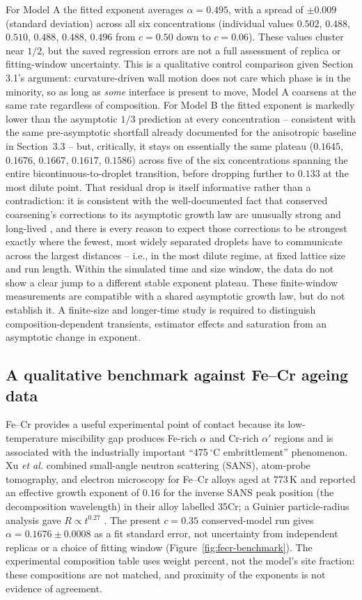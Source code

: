 \documentclass[11pt]{article}
\begin{document}
For Model A the fitted exponent averages $\alpha = 0.495$, with a
spread of $\pm0.009$ (standard deviation) across all six concentrations
(individual values $0.502$, $0.488$, $0.510$, $0.488$, $0.488$, $0.496$
from $c=0.50$ down to $c=0.06$). These values cluster near $1/2$, but the
saved regression errors are not a full assessment of replica or fitting-window
uncertainty. This is a qualitative control comparison given Section 3.1's
argument: curvature-driven wall motion does not care which phase is in
the minority, so as long as \emph{some} interface is present to move,
Model A coarsens at the same rate regardless of composition. For Model B
the fitted exponent is markedly lower than the asymptotic $1/3$
prediction at every concentration -- consistent with the same
pre-asymptotic shortfall already documented for the anisotropic baseline
in Section~3.3 -- but, critically, it stays on essentially the same
plateau ($0.1645$, $0.1676$, $0.1667$, $0.1617$, $0.1586$) across five of the
six concentrations spanning the entire bicontinuous-to-droplet
transition, before dropping further to $0.133$ at the most dilute point.
That residual drop is itself informative rather than a contradiction: it
is consistent with the well-documented fact that conserved coarsening's
corrections to its asymptotic growth law are unusually strong and
long-lived \cite{Bray1994}, and there is every reason to expect those
corrections to be strongest exactly where the fewest, most widely
separated droplets have to communicate across the largest distances --
i.e., in the most dilute regime, at fixed lattice size and run length.
Within the simulated time and size window, the data do not show a clear
jump to a different stable exponent plateau. These finite-window measurements
are compatible with a shared asymptotic growth law, but do not establish it.
A finite-size and longer-time study is required to distinguish
composition-dependent transients, estimator effects and saturation from
an asymptotic change in exponent.

\subsection{A qualitative benchmark against Fe--Cr ageing data}

Fe--Cr provides a useful experimental point of contact because its
low-temperature miscibility gap produces Fe-rich $\alpha$ and Cr-rich
$\alpha'$ regions and is associated with the industrially important
``475\,$^\circ$C embrittlement'' phenomenon. Xu \emph{et al.} combined
small-angle neutron scattering (SANS), atom-probe tomography, and electron
microscopy for Fe--Cr alloys aged at 773\,K and reported an effective growth
exponent of $0.16$ for the inverse SANS peak position (the decomposition
wavelength) in their alloy labelled 35Cr; a Guinier particle-radius analysis gave
$R\propto t^{0.27}$ \cite{Xu2016}. The present $c=0.35$ conserved-model run
gives $\alpha=0.1676\pm0.0008$ as a fit standard error, not uncertainty
from independent replicas or a choice of fitting window
(Figure~\ref{fig:fecr-benchmark}). The experimental composition table uses
weight percent, not the model's site fraction: these compositions are not
matched, and proximity of the exponents is not evidence of agreement.
\end{document}
